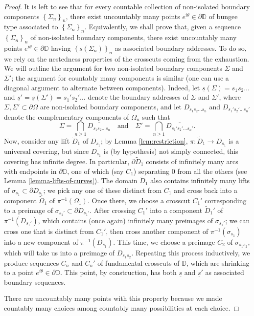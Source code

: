 \documentclass[11pt,a4paper,reqno]{amsart}
\theoremstyle{plain}
\theoremstyle{definition}
\theoremstyle{plain}
\def\DD{\mathbb{D}}
\renewcommand{\tilde}{\widetilde}
\begin{document}
\begin{proof}
	It is left to see that for every countable collection of non-isolated boundary components $ \left\lbrace \Sigma_n \right\rbrace _n$, there exist uncountably many  points $ e^{i\theta}\in\partial\mathbb{D} $ of bungee type associated to $ \left\lbrace \Sigma_n \right\rbrace _n$. Equivalently, we shall prove that, given a sequence $ \left\lbrace \Sigma_n \right\rbrace _n$ of non-isolated boundary components, there exist uncountably many points $ e^{i\theta}\in\partial\mathbb{D} $ having $ \left\lbrace \underline{s}(\Sigma_n) \right\rbrace _n$ as associated boundary addresses. To do so, we rely on the nestedness properties of the crosscuts coming from the exhaustion. We will outline the argument for two non-isolated boundary components $\Sigma$ and $\Sigma'$; the argument for countably many components is similar (one can use a diagonal argument to alternate between components). Indeed, let $\underline{s}(\Sigma) = s_1s_2\dots$ and $\underline{s}'=\underline{s}(\Sigma') = s_1's_2'\dots$ denote the boundary addresses of $\Sigma$ and $\Sigma'$, where $\Sigma, \Sigma'\subset\partial\Omega$ are non-isolated boundary components, and let $D_{s_1s_2\dots s_n}$ and $D_{s_1's_2'\dots s_n'}$ denote the complementary components of $\Omega_n$ such that
	\[ \Sigma = \bigcap_{n\geq 1} \overline{D_{s_1s_2\dots s_n}} \  \ \ \text{ and } \ \ \  \Sigma' = \bigcap_{n\geq 1} \overline{D_{s_1's_2'\dots s_n'}}. \]
	Now, consider any lift $\tilde D_1$ of $D_{s_1}$; by Lemma \ref{lem:restriction}, $\pi\colon\tilde D_1\to D_{s_1}$ is a universal covering, but since $D_{s_1}$ is (by hypothesis) not simply connected, this covering has infinite degree. In particular, $\partial\tilde D_1$ consists of infinitely many arcs with endpoints in $\partial\DD$, one of which (say $C_1$) separating $0$ from all the others (see Lemma \ref{lemma-lifts-of-curves}). The domain $\tilde D_1$ also contains infinitely many lifts of $\sigma_{s_1}\subset\partial D_{s_1}$; we pick any one of these distinct from $C_1$ and cross back into a component $\tilde \Omega_1$ of $\pi^{-1}(\Omega_1)$. Once there, we choose a crosscut $C_1'$ corresponding to a preimage of $\sigma_{s_1'}\subset \partial  D_{s_1'}$. After crossing $C_1'$ into a component $\tilde D_1'$ of $\pi^{-1}(D_{s_1'})$, which contains (once again) infinitely many preimages of $\sigma_{s_1'}$; we can cross one that is distinct from $C_1'$, then cross another component of $\pi^{-1}(\sigma_{s_1})$ into a new component of $\pi^{-1}(D_{s_1})$. This time, we choose a preimage $C_2$ of $\sigma_{s_1s_2}$, which will take us into a preimage of $D_{s_1s_2}$. Repeating this process inductively, we produce sequences $C_n$ and $C_n'$ of fundamental crosscuts of $\DD$, which are shrinking to a point $e^{i\theta}\in\partial\DD$. This point, by construction, has both $\underline{s}$ and $\underline{s}'$ as associated boundary sequences.

	There are uncountably many points with this property because we made countably many choices among countably many possibilities at each choice.
\end{proof}
\end{document}
